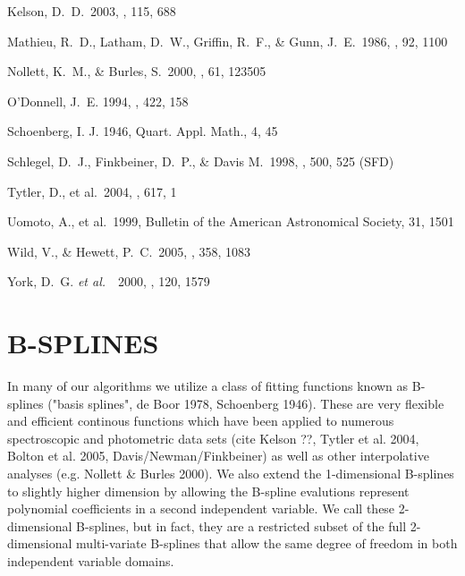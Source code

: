 \documentclass[12pt,preprint]{aastex}
\newcommand{\etal}{{\it et al.}~}
\begin{document}
\begin{thebibliography}{DUM}
 Kelson, D.~D.\ 2003, \pasp, 
115, 688 

\bibitem[Mathieu \etal\ (1896)]{1986AJ...92...1100} Mathieu, R.~D.,
Latham, D.~W., Griffin, R.~F., \& Gunn, J.~E.\ 1986, \aj, 92, 1100

 Nollett, K.~M., \& 
Burles, S.\ 2000, \prd, 61, 123505 
 
O'Donnell, J.\ E. 1994, \apj, 422, 158

\bibitem[Schoenberg 1946]{} Schoenberg, I. J. 1946, Quart. Appl. Math., 4, 45

Schlegel, D.\ J., Finkbeiner, D.\ P., \& Davis M.\ 1998, \apj, 500, 525 (SFD)

 Tytler, D., et al.\ 
2004, \apj, 617, 1 

 Uomoto, A., et al.\ 
1999, Bulletin of the American Astronomical Society, 31, 1501 

 Wild, V., \& Hewett, 
P.~C.\ 2005, \mnras, 358, 1083 
  
York, D.\ G. \etal\ 2000, \aj, 120, 1579

\end{thebibliography}
\clearpage

\appendix
\section{B-SPLINES}
\label{bsplines}

In many of our algorithms we utilize a class of fitting functions known
as B-splines ("basis splines", de Boor 1978, Schoenberg 1946).  
These are very flexible and efficient 
continous functions which have been applied to numerous spectroscopic
and photometric data sets (cite Kelson ??, Tytler et al. 2004, 
Bolton et al. 2005, Davis/Newman/Finkbeiner) as well as other interpolative
analyses (e.g. Nollett \& Burles 2000).  
We also extend the 1-dimensional
B-splines to slightly higher dimension by allowing the B-spline evalutions
represent polynomial coefficients in a second independent variable.  We 
call these 2-dimensional B-splines, but in fact, 
they are a restricted subset of the full 2-dimensional multi-variate B-splines 
that allow the same degree of freedom in both independent variable domains.
\end{document}
